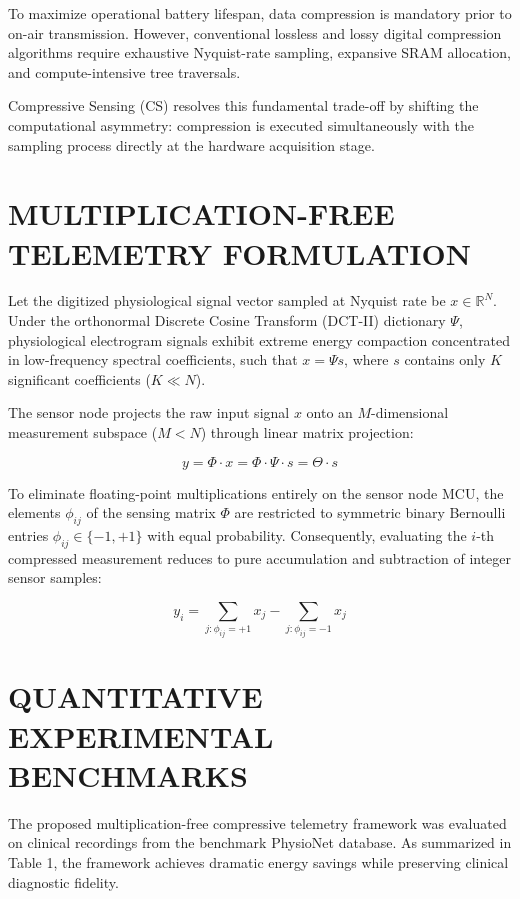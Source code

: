 \documentclass[journal,twocolumn,10pt]{IEEEtran}
\begin{document}
To maximize operational battery lifespan, data compression is mandatory prior to on-air transmission. However, conventional lossless and lossy digital compression algorithms require exhaustive Nyquist-rate sampling, expansive SRAM allocation, and compute-intensive tree traversals.

Compressive Sensing (CS) resolves this fundamental trade-off by shifting the computational asymmetry: compression is executed simultaneously with the sampling process directly at the hardware acquisition stage.

\section{MULTIPLICATION-FREE TELEMETRY FORMULATION}
Let the digitized physiological signal vector sampled at Nyquist rate be $x \in \mathbb{R}^N$. Under the orthonormal Discrete Cosine Transform (DCT-II) dictionary $\Psi$, physiological electrogram signals exhibit extreme energy compaction concentrated in low-frequency spectral coefficients, such that $x = \Psi s$, where $s$ contains only $K$ significant coefficients ($K \ll N$).

The sensor node projects the raw input signal $x$ onto an $M$-dimensional measurement subspace ($M < N$) through linear matrix projection:

\begin{equation}
y = \Phi \cdot x = \Phi \cdot \Psi \cdot s = \Theta \cdot s
\end{equation}

To eliminate floating-point multiplications entirely on the sensor node MCU, the elements $\phi_{ij}$ of the sensing matrix $\Phi$ are restricted to symmetric binary Bernoulli entries $\phi_{ij} \in \{-1, +1\}$ with equal probability. Consequently, evaluating the $i$-th compressed measurement reduces to pure accumulation and subtraction of integer sensor samples:

\begin{equation}
y_i = \sum_{j: \phi_{ij} = +1} x_j - \sum_{j: \phi_{ij} = -1} x_j
\end{equation}

\section{QUANTITATIVE EXPERIMENTAL BENCHMARKS}
The proposed multiplication-free compressive telemetry framework was evaluated on clinical recordings from the benchmark PhysioNet database. As summarized in Table 1, the framework achieves dramatic energy savings while preserving clinical diagnostic fidelity.
\end{document}
